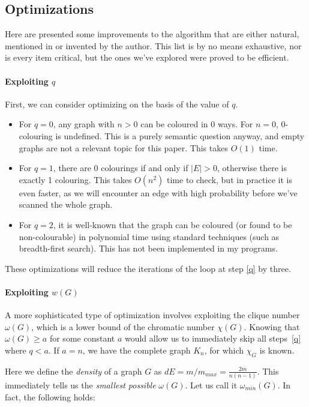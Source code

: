 \documentclass[a4paper]{article}
\begin{document}
\subsection{Optimizations}\label{opts}
Here are presented some improvements to the algorithm that are either natural, mentioned in \cite{cov_pack} or invented by the author. This list is by no means exhaustive, nor is every item critical, but the ones we've explored were proved to be efficient.

\paragraph{Exploiting $q$}
First, we can consider optimizing on the basis of the value of $q$.
\begin{itemize}
\item For $q = 0$, any graph with $n > 0$ can be coloured in 0 ways. For $n = 0$, 0-colouring is undefined. This is a purely semantic question anyway, and empty graphs are not a relevant topic for this paper. This takes $O(1)$ time.
\item For $q = 1$, there are 0 colourings if and only if $|E| > 0$, otherwise there is exactly 1 colouring. This takes $O(n^2)$ time to check, but in practice it is even faster, as we will encounter an edge with high probability before we've scanned the whole graph.
\item For $q = 2$, it is well-known that the graph can be coloured (or found to be non-colourable) in polynomial time using standard techniques (such as breadth-first search). This has not been implemented in my programs.
\end{itemize}

These optimizations will reduce the iterations of the loop at step \ref{q} by three.

\paragraph{Exploiting $w(G)$}
A more sophisticated type of optimization involves exploiting the clique number $\omega(G)$, which is a lower bound of the chromatic number $\chi(G)$. Knowing that $\omega(G) \geq a$ for some constant $a$ would allow us to immediately skip all steps~\ref{q} where $q < a$. If $a = n$, we have the complete graph $K_n$, for which $\chi_G$ is known.

Here we define the \emph{density} of a graph $G$ as $dE = m/m_{max} = \frac{2m}{n(n-1)}$. This immediately tells us the \emph{smallest possible} $\omega(G)$. Let us call it $\omega_{min}(G)$. In fact, the following holds:
\end{document}

